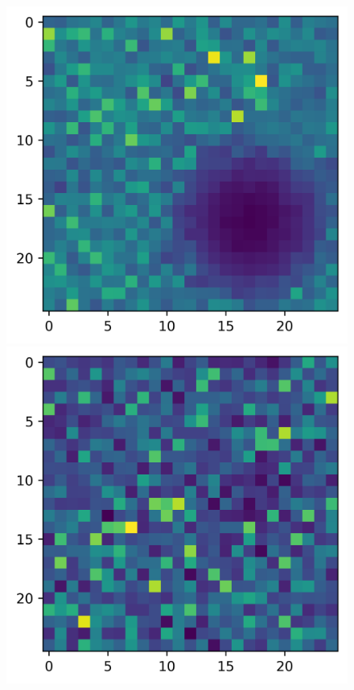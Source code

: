 \begin{figure}
\begin{multicols}{2}
    \includegraphics[width=\linewidth]{Graphics/guassian-2d-experiment-aprox.png}\par 
    \includegraphics[width=\linewidth]{Graphics/gaussian-2d-experiment-horizontal.png}\par 

\end{multicols}
\end{figure}
